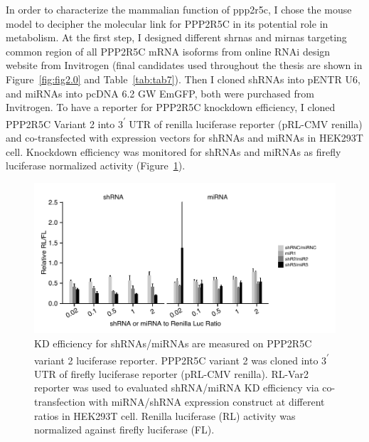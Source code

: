 In order to characterize the mammalian function of \gls{ppp2r5c},  I chose the mouse model  to decipher the molecular link for PPP2R5C in its potential role in metabolism. At the first step, I designed different \gls{shrna}s and \gls{mirna}s targeting common region of all PPP2R5C mRNA isoforms from online RNAi design website from Invitrogen \cite{_invitrogen_2014} (final candidates used throughout the thesis are shown in Figure~\ref{fig:fig2.0} and Table~\ref{tab:tab7}). Then I cloned shRNAs into pENTR U6, and miRNAs into pcDNA 6.2 GW EmGFP, both were purchased from Invitrogen. To have a reporter for PPP2R5C knockdown efficiency, I cloned PPP2R5C Variant 2 into 3\textsuperscript{$\prime$} UTR of renilla luciferase reporter (pRL-CMV renilla) and co-transfected with expression vectors for shRNAs and miRNAs in HEK293T cell. Knockdown efficiency was monitored for shRNAs and miRNAs as firefly luciferase normalized activity (Figure~\ref{fig:fig2.5}). 

\begin{figure}[htbp]
\centering
\includegraphics[width=1\textwidth]{figs/fig2-5 shR miR kd luc.pdf}
\caption[shRNA/miRNA KD efficiency on PPP2R5C luciferase reporter]{\footnotesize KD efficiency for shRNAs/miRNAs are measured on PPP2R5C variant 2 luciferase reporter. PPP2R5C variant 2 was cloned into 3\textsuperscript{$\prime$} UTR of firefly luciferase reporter (pRL-CMV renilla). RL-Var2 reporter was used to evaluated shRNA/miRNA KD efficiency via co-transfection with miRNA/shRNA expression construct at different ratios in HEK293T cell. Renilla luciferase (RL) activity was normalized against firefly luciferase (FL).}
\label{fig:fig2.5}
\end{figure}

